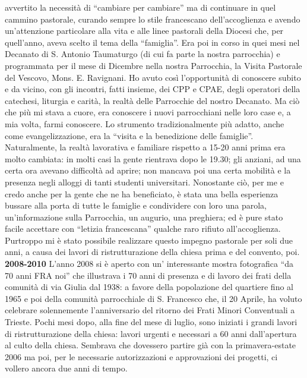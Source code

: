 avvertito la necessità di “cambiare per cambiare” ma di continuare in quel cammino pastorale, 
curando sempre lo stile francescano dell'accoglienza e avendo un'attenzione particolare alla vita e 
alle linee pastorali della Diocesi che, per quell'anno, aveva scelto il tema della “famiglia”.
Era poi in corso in quei mesi nel Decanato di S. Antonio Taumaturgo (di cui fa parte la nostra 
parrocchia) e programmata per il mese di Dicembre nella nostra Parrocchia, la Visita Pastorale del 
Vescovo, Mons. E. Ravignani.
Ho avuto così l'opportunità di conoscere subito e da vicino, con gli incontri, fatti insieme, dei CPP e 
CPAE, degli operatori della catechesi, liturgia e carità, la realtà delle Parrocchie del nostro 
Decanato. Ma ciò che più mi stava a cuore, era conoscere i nuovi parrocchiani nelle loro case e, a 
mia volta, farmi conoscere.
Lo strumento tradizionalmente più adatto, anche come evangelizzazione, era la “visita e la 
benedizione delle famiglie”. Naturalmente, la realtà lavorativa e familiare rispetto a 15-20 anni 
prima era molto cambiata: in molti casi la gente rientrava dopo le 19.30; gli anziani, ad una certa 
ora avevano difficoltà ad aprire; non mancava poi una certa mobilità e la presenza negli alloggi di 
tanti studenti universitari. 
Nonostante ciò, per me e credo anche per la gente che ne ha beneficiato, è stata una bella esperienza 
bussare alla porta di tutte le famiglie e condividere con loro una parola, un'informazione sulla 
Parrocchia, un augurio, una preghiera; ed è pure stato facile accettare con “letizia francescana” 
qualche raro rifiuto all'accoglienza. Purtroppo mi è stato possibile realizzare questo impegno 
pastorale per soli due anni, a causa dei lavori di ristrutturazione della chiesa prima e del convento, 
poi.
\bigbreak
\noindent \textbf{2008-2010}
\medbreak
\noindent L'anno 2008 si è aperto con un' interessante mostra fotografica “da 70 anni FRA noi” che 
illustrava i 70 anni di presenza e di lavoro dei frati della comunità di via Giulia dal 1938: a favore 
della popolazione del quartiere fino al 1965 e poi della comunità parrocchiale di S. Francesco che, il 
20 Aprile, ha voluto celebrare solennemente l'anniversario del ritorno dei Frati Minori Conventuali 
a Trieste.
Pochi mesi dopo, alla fine del mese di luglio, sono iniziati i grandi lavori di ristrutturazione della 
chiesa: lavori urgenti e necessari a 60 anni dall'apertura al culto della chiesa.
Sembrava che dovessero partire già con la primavera-estate 2006 ma poi, per le necessarie 
autorizzazioni e approvazioni dei progetti, ci vollero ancora due anni di tempo.
